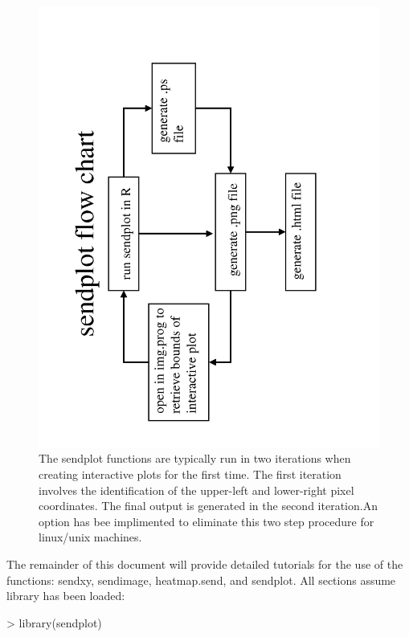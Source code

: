 \documentclass[]{article}
\begin{document}
\begin{center}
\begin{figure}
\includegraphics[angle=270]{sendplotFlowChart}
\caption{The sendplot functions are typically run in two iterations when creating interactive plots for the first time. The first iteration involves the identification of the upper-left and lower-right pixel coordinates. The final output is generated in the second iteration.An option has bee implimented to eliminate this two step procedure for linux/unix machines.}
\end{figure}
\end{center}


\indent The remainder of this document will provide detailed tutorials for the use of the functions: sendxy, sendimage, heatmap.send, and sendplot. All sections assume library has been loaded:

\begin{Schunk}
\begin{Sinput}
> library(sendplot)
\end{Sinput}
\end{Schunk}
\end{document}

